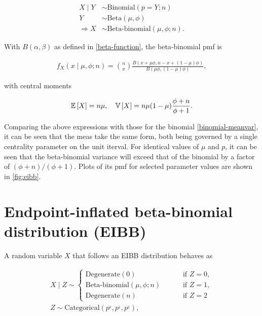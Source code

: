 \begin{equation}
\begin{split}
X \mid Y &\sim \text{Binomial}(p=Y; n)\\
Y &\sim \text{Beta}(\mu, \phi)\\
\Rightarrow X &\sim \text{Beta-binomial}(\mu, \phi; n).
\end{split}
\end{equation}

With $B(\alpha,\beta)$ as defined in \ref{beta-function}, the beta-binomial pmf is

\begin{equation}
\begin{split}
f_X(x \mid \mu, \phi; n) = \binom{n}{x}\frac{B(x+\mu\phi, n - x + (1-\mu)\phi)}{B(\mu\phi, (1-\mu)\phi)},
\end{split}
\label{betabinomial-pmf}
\end{equation}

with central moments

\begin{equation}
\begin{split}
{\mathbb E}\left[ X \right] = n\mu, \quad {\mathbb V}\left[ X \right] = n\mu(1-\mu)\frac{\phi+n}{\phi+1}.
\end{split}
\end{equation}

Comparing the above expressions with those for the binomial \ref{binomial-meanvar}, it can be seen that the meas take the same form, both being governed by a single centrality parameter on the unit iterval. For identical values of $\mu$ and $p$, it can be seen that the beta-binomial variance will exceed that of the binomial by a factor of $(\phi+n)/(\phi+1)$. Plots of its pmf for selected parameter values are shown in \ref{fig:eibb}.

\section{Endpoint-inflated beta-binomial distribution (EIBB)}
\label{sec:eibb-dist}

A random variable $X$ that follows an EIBB distribution behaves as

\begin{equation}
\begin{split}
X \mid Z \sim
\begin{cases}
\text{Degenerate}(0) \qquad &\text{ if } Z=0,\\
\text{Beta-binomial}(\mu, \phi; n) \qquad &\text{ if } Z=1,\\
\text{Degenerate}(n) \qquad &\text{ if } Z=2
\end{cases}\\
Z \sim \text{Categorical}(p^{_0}, p^{_1}, p^{_2}),
\end{split}
\label{eibb-distribution}
\end{equation}

